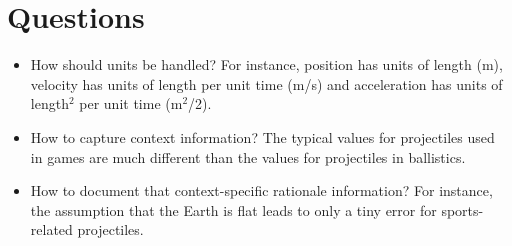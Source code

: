 \documentclass{article}
\begin{document}
\section{Questions}

\begin{itemize}
    \item How should units be handled?  For instance, position has units of
    length (m), velocity has units of length per unit time (m/s) and
    acceleration has units of length$^2$ per unit time (m$^2$/2).
    \item How to capture context information?  The typical values for
    projectiles used in games are much different than the values for projectiles
    in ballistics.
    \item How to document that context-specific rationale information?  For
    instance, the assumption that the Earth is flat leads to only a tiny error
    for sports-related projectiles.
\end{itemize}
\end{document}
